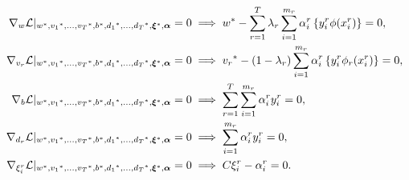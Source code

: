 \begin{align}
    \grad_{{w}} \lagr \vert_{\optim{{w}}, \optim{{v}_1}, \ldots, \optim{{v}_\ntasks}, \optim{b}, \optim{d_1}, \ldots, \optim{d_\ntasks}, \optim{\fv{\xi}}, {\fv{\alpha}}} = 0  &\implies \optim{{w}} - \sum_{r= 1}^\ntasks \lambda_r \sum_{i=1}^{m_r} {\alpha_i^r} \left\lbrace y_i^r \phi(x_i^r) \right\rbrace = 0 , \label{eq:common_repr_conv_l2} \\
    \grad_{{v}_r} \lagr \vert_{\optim{{w}}, \optim{{v}_1}, \ldots, \optim{{v}_\ntasks}, \optim{b}, \optim{d_1}, \ldots, \optim{d_\ntasks}, \optim{\fv{\xi}}, {\fv{\alpha}}} = 0 &\implies \optim{{v}_r} - (1 - \lambda_r) \sum_{i=1}^{m_r} {\alpha_i^r} \left\lbrace y_i^r \phi_r(x_i^r) \right\rbrace = 0 , \label{eq:specific_repr_conv_l2} \\
    \grad_{b} \lagr \vert_{\optim{{w}}, \optim{{v}_1}, \ldots, \optim{{v}_\ntasks}, \optim{b}, \optim{d_1}, \ldots, \optim{d_\ntasks}, \optim{\fv{\xi}}, {\fv{\alpha}}} = 0  &\implies \sum_{r= 1}^T \sum_{i=1}^{m_r} {\alpha_i^r} y_i^r = 0 , \label{eq:specific_eqconstr_conv_l2}  \\
    \grad_{{d}_r} \lagr \vert_{\optim{{w}}, \optim{{v}_1}, \ldots, \optim{{v}_\ntasks}, \optim{b}, \optim{d_1}, \ldots, \optim{d_\ntasks}, \optim{\fv{\xi}}, {\fv{\alpha}}} = 0 &\implies \sum_{i=1}^{m_r} {\alpha_i^r} y_i^r = 0 , \label{eq:common_eqconstr_conv_l2} \\
    \grad_{\xi_i^r} \lagr \vert_{\optim{{w}}, \optim{{v}_1}, \ldots, \optim{{v}_\ntasks}, \optim{b}, \optim{d_1}, \ldots, \optim{d_\ntasks}, \optim{\fv{\xi}}, {\fv{\alpha}}} = 0 &\implies C \xi_i^r - {\alpha_i^r} = 0 . \label{eq:xi_feas_conv_l2}
\end{align}
